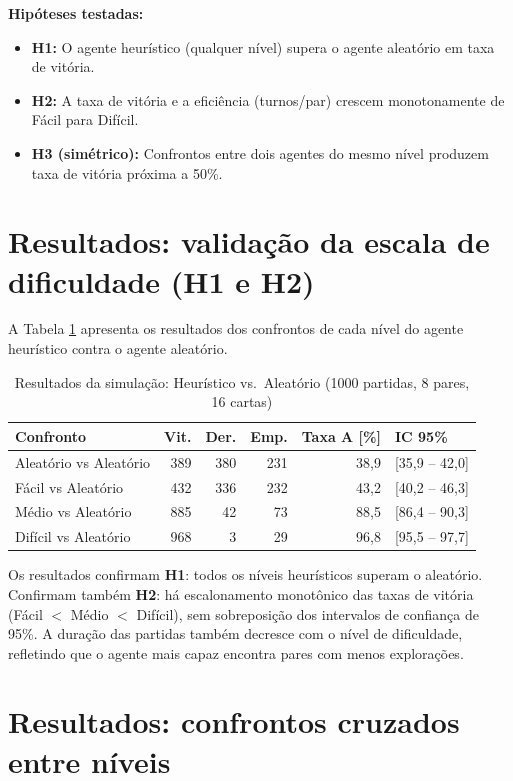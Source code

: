 \documentclass[
    12pt,
    openright,
    twoside,
    a4paper,
    english,
    brazil
]{abntex2}
\begin{document}
\textbf{Hipóteses testadas:}
\begin{itemize}
  \item \textbf{H1:} O agente heurístico (qualquer nível) supera o agente aleatório em taxa de vitória.
  \item \textbf{H2:} A taxa de vitória e a eficiência (turnos/par) crescem monotonamente de Fácil para Difícil.
  \item \textbf{H3 (simétrico):} Confrontos entre dois agentes do mesmo nível produzem taxa de vitória próxima a 50\%.
\end{itemize}

\section{Resultados: validação da escala de dificuldade (H1 e H2)}

A Tabela \ref{tab:resultados_vs_aleatorio} apresenta os resultados dos confrontos de cada nível do agente heurístico contra o agente aleatório.

\begin{table}[htb]
\centering
\caption{Resultados da simulação: Heurístico vs.\ Aleatório (1000 partidas, 8 pares, 16 cartas)}
\label{tab:resultados_vs_aleatorio}
\begin{tabular}{lrrrrl}
\toprule
\textbf{Confronto} & \textbf{Vit.} & \textbf{Der.} & \textbf{Emp.} & \textbf{Taxa A [\%]} & \textbf{IC 95\%} \\
\midrule
Aleatório vs Aleatório & 389 & 380 & 231 & 38,9 & [35,9 -- 42,0] \\
Fácil vs Aleatório     & 432 & 336 & 232 & 43,2 & [40,2 -- 46,3] \\
Médio vs Aleatório     & 885 &  42 &  73 & 88,5 & [86,4 -- 90,3] \\
Difícil vs Aleatório   & 968 &   3 &  29 & 96,8 & [95,5 -- 97,7] \\
\bottomrule
\end{tabular}
\end{table}

Os resultados confirmam \textbf{H1}: todos os níveis heurísticos superam o aleatório. Confirmam também \textbf{H2}: há escalonamento monotônico das taxas de vitória (Fácil $<$ Médio $<$ Difícil), sem sobreposição dos intervalos de confiança de 95\%. A duração das partidas também decresce com o nível de dificuldade, refletindo que o agente mais capaz encontra pares com menos explorações.

\section{Resultados: confrontos cruzados entre níveis}
\end{document}
